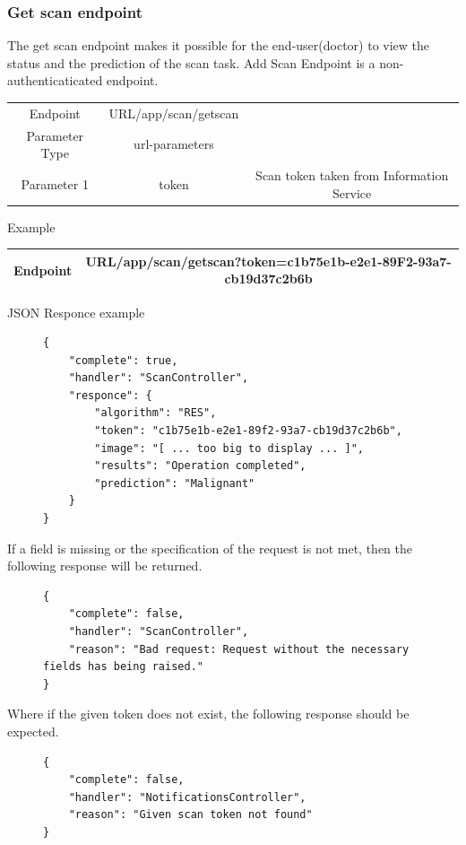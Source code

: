 				\subsubsection{Get scan endpoint}
					The get scan endpoint makes it possible for the end-user(doctor) to view the status and the prediction of the scan task. Add Scan Endpoint is a non-authenticaticated endpoint.
					\begin{center}
						\begin{tabular}{ |c|c|c| } 
							\hline
							Endpoint & {{URL}}/app/scan/getscan& \\
							Parameter Type & url-parameters  &\\
							Parameter 1 & token  &Scan token taken from Information Service\\
							\hline
						\end{tabular}
					\end{center}
					Example
					\begin{center}
						\begin{tabular}{ |c|c| } 
							\hline
							Endpoint & {{URL}}/app/scan/getscan?token=c1b75e1b-e2e1-89F2-93a7-cb19d37c2b6b\\
							\hline
						\end{tabular}
					\end{center}
					JSON Responce example
					\begin{figure}[H]
						\iftrue
						\begin{lstlisting}[]
{
	"complete": true,
	"handler": "ScanController",
	"responce": {
		"algorithm": "RES",
		"token": "c1b75e1b-e2e1-89f2-93a7-cb19d37c2b6b",
		"image": "[ ... too big to display ... ]",
		"results": "Operation completed",
		"prediction": "Malignant"
	}
}
						\end{lstlisting}
					\end{figure}
					If a field is missing or the specification of the request is not met, then the following response will be returned.
					\begin{figure}[H]
						\iftrue
						\begin{lstlisting}[]
{
	"complete": false,
	"handler": "ScanController",
	"reason": "Bad request: Request without the necessary fields has being raised."
}					
						\end{lstlisting}
					\end{figure}
					Where if the given token does not exist, the following response should be expected.
					\begin{figure}[H]
						\iftrue
						\begin{lstlisting}[]
{
	"complete": false,
	"handler": "NotificationsController",
	"reason": "Given scan token not found"
}		
						\end{lstlisting}
					\end{figure}
